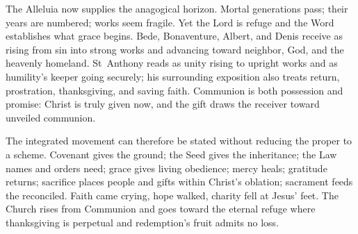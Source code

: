 The Alleluia now supplies the anagogical horizon. Mortal generations pass;
their years are numbered; works seem fragile. Yet the Lord is refuge and the
Word establishes what grace begins. Bede, Bonaventure, Albert, and Denis
receive  as rising from sin into strong works and advancing
toward neighbor, God, and the heavenly homeland. St~Anthony reads
 as unity rising to upright works and  as humility's
keeper going securely; his surrounding exposition also treats return,
prostration, thanksgiving, and saving faith.
Communion is both
possession and promise: Christ is truly given now, and the gift draws the
receiver toward unveiled communion.

The integrated movement can therefore be stated without reducing the proper to
a scheme. Covenant gives the ground; the Seed gives the inheritance; the Law
names and orders need; grace gives living obedience; mercy heals; gratitude
returns; sacrifice places people and gifts within Christ's oblation; sacrament
feeds the reconciled. Faith came crying, hope walked, charity fell at Jesus'
feet. The Church rises from Communion and goes toward the eternal refuge where
thanksgiving is perpetual and redemption's fruit admits no loss.
